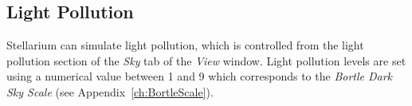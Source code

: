 
\subsection{Light Pollution}
\label{sec:LightPollution}

Stellarium can simulate light pollution, which is controlled from the
light pollution section of the \emph{Sky} tab of the \emph{View} window.
Light pollution levels are set using a numerical value between 1 and 9
which corresponds to the \emph{Bortle Dark Sky Scale} (see Appendix~\ref{ch:BortleScale}).




